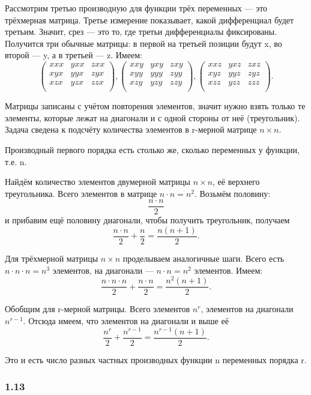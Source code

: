\documentclass{book}
\begin{document}
Рассмотрим третью производную для функции трёх переменных --- это трёхмерная матрица. Третье измерение показывает, какой дифференциал будет третьим. Значит, срез --- это то, где третьи дифференциалы фиксированы. Получится три обычные матрицы: в первой на третьей позиции будут x, во второй --- y, а в третьей --- z. Имеем: 
$$
\begin{pmatrix}
xxx & yxx & zxx \\ 
xyx & yyx & zyx \\
xzx & yzx & zzx \\
\end{pmatrix}
,
\begin{pmatrix}
xxy & yxy & zxy \\
xyy & yyy & zyy \\
xzy & yzy & zzy \\
\end{pmatrix}
,
\begin{pmatrix}
xxz & yxz & zxz \\
xyz & yyz & zyz \\
xzz & yzz & zzz \\
\end{pmatrix}
.$$

Матрицы записаны с учётом повторения элементов, значит нужно взять только те элементы, которые лежат на диагонали и с одной стороны от неё (треугольник). Задача сведена к подсчёту количества элементов в r-мерной матрице $n\times n$.

Производный первого порядка есть столько же, сколько переменных у функции, т.е. n.

Найдём количество элементов двумерной матрицы $n\times n$, её верхнего треугольника. Всего элементов в матрице $n\cdot n=n^2$. Возьмём половину: $$\frac{n\cdot n}{2}$$ и прибавим ещё половину диагонали, чтобы получить треугольник, получаем $$\frac{n\cdot n}{2}+\frac{n}{2}=\frac{n(n+1)}{2}.$$

Для трёхмерной матрицы $n\times n$ проделываем аналогичные шаги. Всего есть $n\cdot n\cdot n=n^3$ элементов, на диагонали --- $n\cdot n=n^2$ элементов. Имеем: $$\frac{n\cdot n\cdot n}{2}+\frac{n\cdot n}{2}=\frac{n^2(n+1)}{2}.$$

Обобщим для r-мерной матрицы. Всего элементов $n^r$, элементов на диагонали $n^{r-1}$. Отсюда имеем, что элементов на диагонали и выше её $$\frac{n^r}{2}+\frac{n^{r-1}}{2}=\frac{n^{r-1}(n+1)}{2}.$$

Это и есть число разных частных производных функции n переменных порядка r.

\subsubsection*{1.13}
\end{document}
